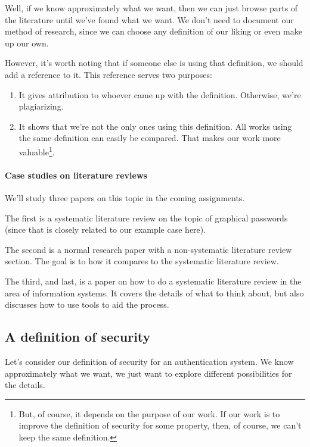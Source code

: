 Well, if we know approximately what we want, then we can just browse parts of 
the literature until we've found what we want.
We don't need to document our method of research, since we can choose any 
definition of our liking or even make up our own.

However, it's worth noting that if someone else is using that definition, we 
should add a reference to it.
This reference serves two purposes:
\begin{enumerate}
  \item It gives attribution to whoever came up with the definition.
    Otherwise, we're plagiarizing.
  \item It shows that we're not the only ones using this definition.
    All works using the same definition can easily be compared.
    That makes our work more valuable\footnote{%
      But, of course, it depends on the purpose of our work.
      If our work is to improve the definition of security for some property, 
      then, of course, we can't keep the same definition.
    }.
\end{enumerate}

\paragraph{Case studies on literature reviews}

We'll study three papers on this topic in the coming assignments.

The first\autocite{GraphicalPasswordsSurvey} is a systematic literature review 
on the topic of graphical passwords (since that is closely related to our 
example case here).

The second\autocite{OfPasswordsAndPeople} is a normal research paper with a 
non-systematic literature review section.
The goal is to how it compares to the systematic literature review.

The third, and last, is a paper on how to do a systematic literature review in 
the area of information systems\autocite{SLRinIS}.
It covers the details of what to think about, but also discusses how to use 
tools to aid the process.

\subsection{A definition of security}

Let's consider our definition of security for an authentication system.
We know approximately what we want, we just want to explore different 
possibilities for the details.


